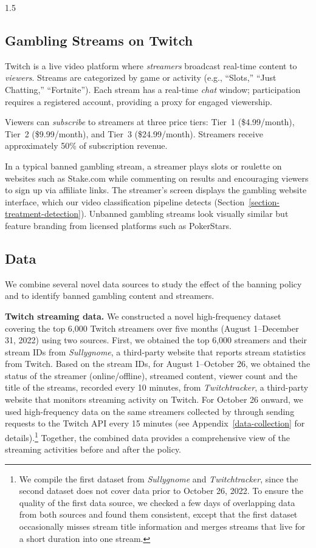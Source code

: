 \documentclass[a4paper,12pt]{article}
\begin{document}
\begin{spacing}{1.5}
\subsection{Gambling Streams on Twitch}\label{subsection-platform-overview}


Twitch is a live video platform where \textit{streamers} broadcast real-time content to \textit{viewers}. Streams are categorized by game or activity (e.g., ``Slots,'' ``Just Chatting,'' ``Fortnite''). Each stream has a real-time \textit{chat} window; participation requires a registered account, providing a proxy for engaged viewership.

Viewers can \textit{subscribe} to streamers at three price tiers: Tier~1 (\$4.99/month), Tier~2 (\$9.99/month), and Tier~3 (\$24.99/month). Streamers receive approximately 50\% of subscription revenue.

In a typical banned gambling stream, a streamer plays slots or roulette on websites such as Stake.com while commenting on results and encouraging viewers to sign up via affiliate links. The streamer's screen displays the gambling website interface, which our video classification pipeline detects (Section~\ref{section-treatment-detection}). Unbanned gambling streams look visually similar but feature branding from licensed platforms such as PokerStars.


\subsection{Data}\label{subsection-data}
We combine several novel data sources to study the effect of the banning policy and to identify banned gambling content and streamers. 

\noindent \textbf{Twitch streaming data.} We constructed a novel high-frequency dataset covering the top 6,000 Twitch streamers over five months (August 1--December 31, 2022) using two sources. First, we obtained the top 6,000 streamers and their stream IDs from \textit{Sullygnome}, a third-party website that reports stream statistics from Twitch. Based on the stream IDs, for August 1--October 26, we obtained the status of the streamer (online/offline), streamed content, viewer count and the title of the streams, recorded every 10 minutes, from \textit{Twitchtracker}, a third-party website that monitors streaming activity on Twitch. For October 26 onward, we used high-frequency data on the same streamers collected by \cite{yangwiptwitch} through sending requests to the Twitch API every 15 minutes (see Appendix~\ref{data-collection} for details).\footnote{We compile the first dataset from \textit{Sullygnome} and \textit{Twitchtracker}, since the second dataset does not cover data prior to October 26, 2022. To ensure the quality of the first data source, we checked a few days of overlapping data from both sources and found them consistent, except that the first dataset occasionally misses stream title information and merges streams that live for a short duration into one stream.} Together, the combined data provides a comprehensive view of the streaming activities before and after the policy. 


\end{spacing}
\end{document}
